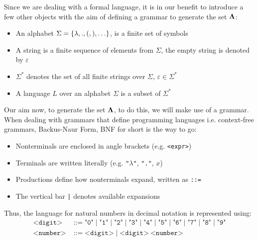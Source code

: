 \documentclass[12pt]{book}
\begin{document}
Since we are dealing with a formal language, it is in our benefit to introduce a few other objects with the aim of defining a grammar to generate the set $\mathbf{\Lambda}$:
\begin{itemize}
\item An alphabet \( \Sigma = \{ \lambda, ., (, ), \ldots \} \), is a finite set of symbols
\item A string is a finite sequence of elements from \( \Sigma \), the empty string is denoted by \( \varepsilon \)
\item \( \Sigma^* \) denotes the set of all finite strings over \( \Sigma \), \( \varepsilon \in \Sigma^* \)
\item A language \( L \) over an alphabet \( \Sigma \) is a subset of \( \Sigma^* \)
\end{itemize}
Our aim now, to generate the set $\mathbf{\Lambda}$,  to do this, we will make use of a grammar. When dealing with grammars that define programming languages i.e. context-free grammars, Backus-Naur Form, BNF for short is the way to go:
\begin{itemize}
\item Nonterminals are enclosed in angle brackets (e.g. \texttt{<expr>})
\item Terminals are written literally (e.g. \texttt{"$\lambda$"}, \texttt{"."}, $x$)
\item Productions define how nonterminals expand, written as \texttt{::=}
\item The vertical bar \texttt{|} denotes available expansions
\end{itemize}
Thus, the language for natural numbers in decimal notation is represented using:
\begin{align*}
  \texttt{<digit>} &\;\texttt{::=}\; \texttt{"0"} \;\texttt{|}\; \texttt{"1"} \;\texttt{|}\; \texttt{"2"} \;\texttt{|}\; \texttt{"3"} \;\texttt{|}\; \texttt{"4"} \;\texttt{|}\; \texttt{"5"} \;\texttt{|}\; \texttt{"6"} \;\texttt{|}\; \texttt{"7"} \;\texttt{|}\; \texttt{"8"} \;\texttt{|}\; \texttt{"9"} \\
  \texttt{<number>} &\;\texttt{::=}\; \texttt{<digit>} \;|\; \texttt{<digit>} \ \texttt{<number>}
\end{align*}
\end{document}
